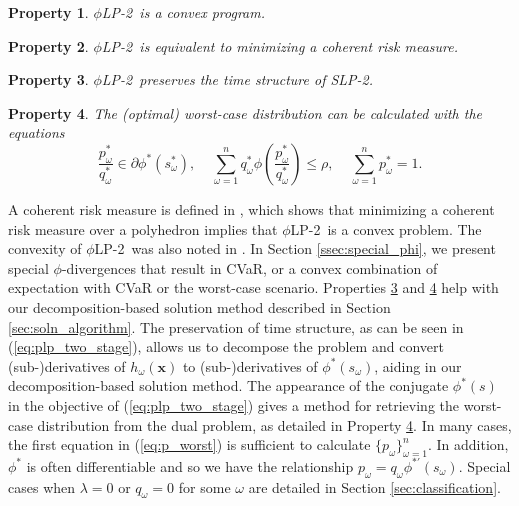 \documentclass[opre,nonblindrev]{informs3} %
\newcommand{\x}{\mathbf{x}}
\newtheorem{property}{Property}
\newcommand{\plp}{$\phi$LP-2}
\begin{document}
\begin{property}
	\label{property:convex}
	\plp\ is a convex program.
\end{property}

\begin{property}
	\label{property:coherent_risk_measure}
	\plp\ is equivalent to minimizing a coherent risk measure.
\end{property}

\begin{property}
	\label{property:time_structure}
	\plp\ preserves the time structure of SLP-2.
\end{property}

\begin{property}
	\label{property:primal_dual_relation}
	The (optimal) worst-case distribution can be calculated with the equations
	\begin{equation}\label{eq:p_worst}
		\frac{p_\omega^*}{q_\omega^*} \in \partial \phi^*\left(s_\omega^*\right), \ \ \ \ \ \sum_{\omega=1}^n q_\omega^* \phi\left(\frac{p_\omega^*}{q_\omega^*}\right) \leq \rho, \ \ \ \ \ \sum_{\omega=1}^n p_\omega^* = 1.
	\end{equation}		
\end{property}

A coherent risk measure is defined in \citep{rockafellar2007coherent}, which shows that minimizing a coherent risk measure over a polyhedron implies that \plp\ is a convex problem.
The convexity of \plp\ was also noted in \citep{bental2011robust}.
In Section \ref{ssec:special_phi}, we present special $\phi$-divergences that result in CVaR, or a convex combination of expectation with CVaR or the worst-case scenario. 
Properties \ref{property:time_structure} and \ref{property:primal_dual_relation} help with our decomposition-based solution method described in Section \ref{sec:soln_algorithm}. 
The preservation of time structure, as can be seen in (\ref{eq:plp_two_stage}), allows us to decompose the problem and convert (sub-)derivatives of $h_\omega(\x)$ to (sub-)derivatives of $\phi^*\left(s_\omega\right)$, aiding in our decomposition-based solution method. 
The appearance of the conjugate $\phi^*(s)$ in the objective of (\ref{eq:plp_two_stage}) gives a method for retrieving the worst-case distribution from the dual problem, as detailed in Property \ref{property:primal_dual_relation}.
In many cases, the first equation in (\ref{eq:p_worst}) is sufficient to calculate $\{p_\omega\}_{\omega=1}^n$.
In addition, $\phi^*$ is often differentiable and so we have the relationship $p_\omega = q_\omega \phi^{* \prime}(s_\omega)$.
Special cases when $\lambda = 0$ or $q_\omega = 0$ for some $\omega$ are detailed in Section \ref{sec:classification}.
\end{document}
